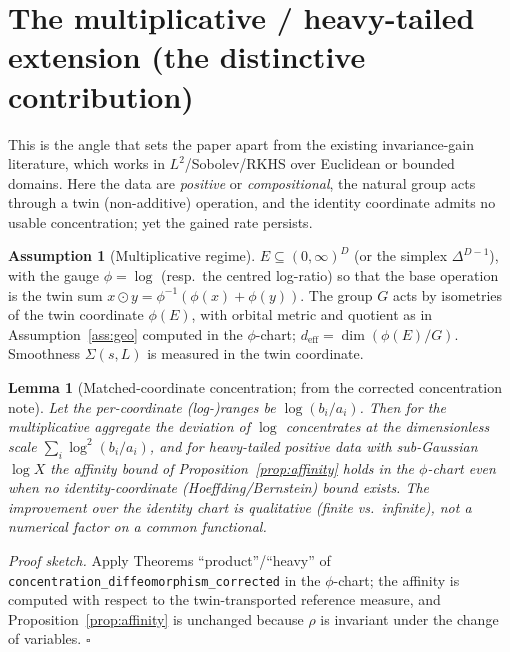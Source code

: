 \documentclass[11pt]{article}
\theoremstyle{plain}
\newtheorem{lemma}[theorem]{Lemma}
\theoremstyle{definition}
\newtheorem{assumption}{Assumption}
\theoremstyle{remark}
\DeclareMathOperator{\dimm}{dim}
\begin{document}
\section{The multiplicative / heavy-tailed extension (the distinctive contribution)}
\label{sec:multiplicative}

This is the angle that sets the paper apart from the existing invariance-gain
literature, which works in $L^2$/Sobolev/RKHS over Euclidean or bounded domains.
Here the data are \emph{positive} or \emph{compositional}, the natural group
acts through a twin (non-additive) operation, and the identity coordinate admits
no usable concentration; yet the gained rate persists.

\begin{assumption}[Multiplicative regime]\label{ass:mult}
$E\subseteq(0,\infty)^D$ (or the simplex $\Delta^{D-1}$), with the gauge
$\phi=\log$ (resp.\ the centred log-ratio) so that the base operation is the twin
sum $x\odot y=\phi^{-1}(\phi(x)+\phi(y))$. The group $G$ acts by isometries of the
twin coordinate $\phi(E)$, with orbital metric and quotient as in
Assumption~\ref{ass:geo} computed in the $\phi$-chart; $d_{\mathrm{eff}}=\dimm(\phi(E)/G)$.
Smoothness $\Sigma(s,L)$ is measured in the twin coordinate.
\end{assumption}

\begin{lemma}[Matched-coordinate concentration; from the corrected concentration note]\label{lem:matched}
Let the per-coordinate (log-)ranges be $\log(b_i/a_i)$. Then for the
multiplicative aggregate the deviation of $\log$ concentrates at the
\emph{dimensionless} scale $\sum_i\log^2(b_i/a_i)$, and for heavy-tailed
positive data with sub-Gaussian $\log X$ the affinity bound of
Proposition~\ref{prop:affinity} holds in the $\phi$-chart even when no
identity-coordinate (Hoeffding/Bernstein) bound exists. The improvement over the
identity chart is \emph{qualitative} (finite vs.\ infinite), not a numerical
factor on a common functional.
\end{lemma}

\noindent\emph{Proof sketch.} Apply Theorems ``product''/``heavy'' of
\texttt{concentration\_diffeomorphism\_corrected} in the $\phi$-chart; the
affinity is computed with respect to the twin-transported reference measure, and
Proposition~\ref{prop:affinity} is unchanged because $\rho$ is invariant under
the change of variables. \hfill$\square$
\end{document}
